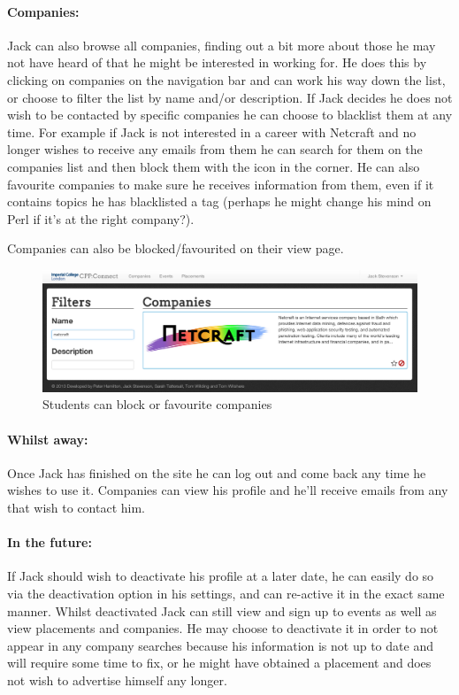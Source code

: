   \paragraph{Companies:}
    Jack can also browse all companies, finding out a bit more about those he may not have heard of that he might be interested in working for. He does this by clicking on companies on the navigation bar and can work his way down the list, or choose to filter the list by name and/or description.
    If Jack decides he does not wish to be contacted by specific companies he can choose to blacklist them at any time. For example if Jack is not interested in a career with Netcraft and no longer wishes to receive any emails from them he can search for them on the companies list and then block them with the icon in the corner. He can also favourite companies to make sure he receives information from them, even if it contains topics he has blacklisted a tag (perhaps he might change his mind on Perl if it's at the right company?).

    Companies can also be blocked/favourited on their view page.

    \begin{figure}[H]\centering
    \includegraphics[scale=0.3]{images/user_experiences/student/block_netcraft}
    \caption{Students can block or favourite companies}
    \end{figure}

  \paragraph{Whilst away:}
    Once Jack has finished on the site he can log out and come back any time he wishes to use it. Companies can view his profile and he'll receive emails from any that wish to contact him.

  \paragraph{In the future:}
    If Jack should wish to deactivate his profile at a later date, he can easily do so via the deactivation option in his settings, and can re-active it in the exact same manner. Whilst deactivated Jack can still view and sign up to events as well as view placements and companies. He may choose to deactivate it in order to not appear in any company searches because his information is not up to date and will require some time to fix, or he might have obtained a placement and does not wish to advertise himself any longer.

